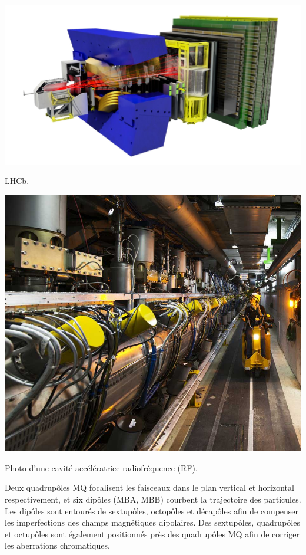 \marginpar
{
	
	\includegraphics[width=\marginparwidth]{LHC/lhcb.png}
	\captionsetup{type=figure}\caption{LHCb.}
	\label{lhcb}
}

\marginpar
{
	\includegraphics[width=\marginparwidth]{LHC/RF.jpg}
	\captionsetup{type=figure}\caption{Photo d'une cavité accélératrice radiofréquence (RF).}
	\label{radio}
}

Deux quadrupôles MQ focalisent les faisceaux dans le plan vertical et horizontal respectivement, et six dipôles (MBA, MBB) courbent la trajectoire des particules. Les dipôles sont entourés de sextupôles, octopôles et décapôles afin de compenser les imperfections des champs magnétiques dipolaires. Des sextupôles, quadrupôles et octupôles sont également positionnés près des quadrupôles MQ afin de corriger les aberrations chromatiques.


